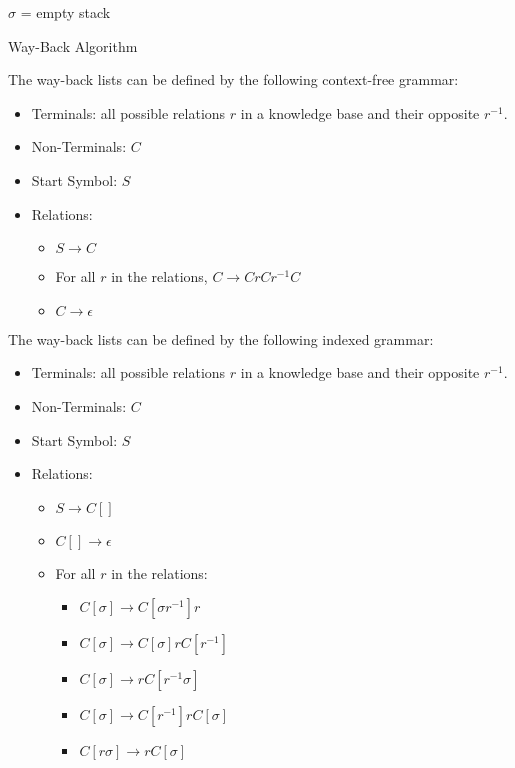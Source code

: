 \documentclass[10pt,a4paper,draft]{article}
\begin{document}
\begin{algorithm}[H]
 \SetAlgoLined
 $\sigma$ = empty stack\;
 \caption{Way-Back Algorithm}
\end{algorithm}


\begin{Definition}
\label{Way-Back List 2}
The way-back lists can be defined by the following context-free grammar:

\begin{itemize}[noitemsep]
\item Terminals: all possible relations $r$ in a knowledge base and their opposite $r^{-1}$.
\item Non-Terminals: $C$
\item Start Symbol: $S$
\item Relations:
\begin{itemize}[noitemsep]
\item $S \rightarrow C$
\item For all $r$ in the relations, $C \rightarrow CrCr^{-1}C$
\item  $C \rightarrow \epsilon$
\end{itemize}
\end{itemize}

\end{Definition}


\begin{Definition}
\label{Way-Back List 3}
The way-back lists can be defined by the following indexed grammar:
\begin{itemize}[noitemsep]
\item Terminals: all possible relations $r$ in a knowledge base and their opposite $r^{-1}$.
\item Non-Terminals: $C$
\item Start Symbol: $S$
\item Relations:
\begin{itemize}
\item $S \rightarrow C[]$
\item  $C[] \rightarrow \epsilon$
\item For all $r$ in the relations:
\begin{itemize}
\item $C[\sigma] \rightarrow C[\sigma r^{-1}] r$
\item $C[\sigma] \rightarrow C[\sigma] r C[r^{-1}]$
\item $C[\sigma] \rightarrow r C[r^{-1} \sigma]$
\item $C[\sigma] \rightarrow C[r^{-1}] r C[\sigma]$
\item $C[r \sigma] \rightarrow r C[\sigma]$
\end{itemize}
\end{itemize}
\end{itemize}
\end{Definition}
\end{document}
